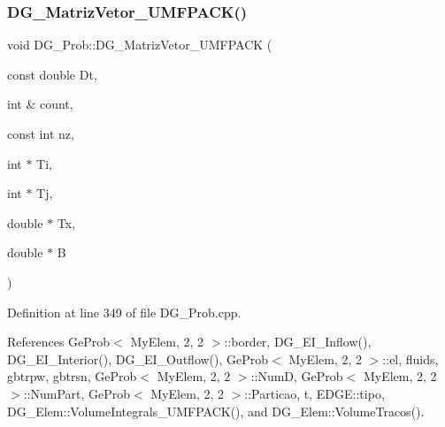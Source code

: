 \subsubsection{\texorpdfstring{D\+G\+\_\+\+Matriz\+Vetor\+\_\+\+U\+M\+F\+P\+A\+C\+K()}{DG\_MatrizVetor\_UMFPACK()}}
{\footnotesize\ttfamily void D\+G\+\_\+\+Prob\+::\+D\+G\+\_\+\+Matriz\+Vetor\+\_\+\+U\+M\+F\+P\+A\+CK (\begin{DoxyParamCaption}\item[{const double}]{Dt,  }\item[{int \&}]{count,  }\item[{const int}]{nz,  }\item[{int $\ast$}]{Ti,  }\item[{int $\ast$}]{Tj,  }\item[{double $\ast$}]{Tx,  }\item[{double $\ast$}]{B }\end{DoxyParamCaption})}



Definition at line 349 of file D\+G\+\_\+\+Prob.\+cpp.



References Ge\+Prob$<$ My\+Elem, 2, 2 $>$\+::border, D\+G\+\_\+\+E\+I\+\_\+\+Inflow(), D\+G\+\_\+\+E\+I\+\_\+\+Interior(), D\+G\+\_\+\+E\+I\+\_\+\+Outflow(), Ge\+Prob$<$ My\+Elem, 2, 2 $>$\+::el, fluids, gbtrpw, gbtrsn, Ge\+Prob$<$ My\+Elem, 2, 2 $>$\+::\+NumD, Ge\+Prob$<$ My\+Elem, 2, 2 $>$\+::\+Num\+Part, Ge\+Prob$<$ My\+Elem, 2, 2 $>$\+::\+Particao, t, E\+D\+G\+E\+::tipo, D\+G\+\_\+\+Elem\+::\+Volume\+Integrals\+\_\+\+U\+M\+F\+P\+A\+C\+K(), and D\+G\+\_\+\+Elem\+::\+Volume\+Tracos().

